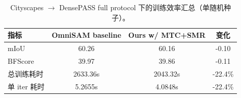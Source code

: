 \begin{table}[t]
  \centering
  \caption{Cityscapes $\rightarrow$ DensePASS full protocol 下的训练效率汇总（单随机种子）。}
  \label{tab:efficiency_analysis}
  \begin{tabular}{lccc}
    \toprule
    指标 & OmniSAM baseline & Ours w/ MTC+SMR & 变化 \\
    \midrule
    mIoU & 60.26 & 60.16 & -0.10 \\
    BFScore & 39.97 & 39.86 & -0.11 \\
    总训练耗时 & 2633.36s & 2043.32s & -22.4\% \\
    单 iter 耗时 & 5.2655s & 4.0848s & -22.4\% \\
    \bottomrule
  \end{tabular}
\end{table}
